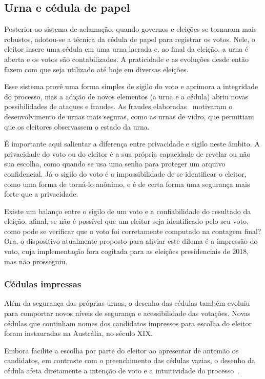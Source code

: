 \subsection{Urna e cédula de papel}

Posterior ao sistema de aclamação, quando governos e eleições se tornaram mais
robustos, adotou-se a técnica da cédula de papel para registrar os votos. Nele,
o eleitor insere uma cédula em uma urna lacrada e, ao final da eleição, a urna
é aberta e os votos são contabilizados. A praticidade e as evoluções desde
então fazem com que seja utilizado até hoje em diversas eleições.

Esse sistema provê uma forma simples de sigilo do voto e aprimora a integridade
do processo, mas a adição de novos elementos (a urna e a cédula) abriu novas
possibilidades de ataques e fraudes. As fraudes elaboradas~\nocite{leslie1856}
motivaram o desenvolvimento de urnas mais seguras, como as urnas de vidro, que
permitiam que os eleitores observassem o estado da urna.

É importante aqui salientar a diferença entre privacidade e sigilo neste
âmbito. A privacidade do voto ou do eleitor é a sua própria capacidade de
revelar ou não sua escolha, como quando se usa uma senha para proteger um
arquivo confidencial. Já o sigilo do voto é a impossibilidade de se identificar
o eleitor, como uma forma de torná-lo anônimo, e é de certa forma uma segurança
mais forte que a privacidade.

Existe um balanço entre o sigilo de um voto e a confiabilidade do resultado da
eleição, afinal, se não é possível que um eleitor seja identificado pelo seu
voto, como pode se verificar que o voto foi corretamente computado na contagem
final? Ora, o dispositivo atualmente proposto para aliviar este dilema é a
impressão do voto, cuja implementação fora cogitada para as eleições
presidenciais de 2018, mas não prosseguiu.

\subsubsection{Cédulas impressas}

Além da segurança das próprias urnas, o desenho das cédulas também evoluiu para
comportar novos níveis de segurança e acessibilidade das votações. Novas
cédulas que continham nomes dos candidatos impressos para escolha do eleitor
foram instauradas na Austrália, no século XIX.

Embora facilite a escolha por parte do eleitor ao apresentar de antemão os
candidatos, em contraste com o preenchimento das cédulas vazias, o desenho da
cédula afeta diretamente a intenção de voto e a intuitividade do
processo~\cite{everett2006measuring}.

